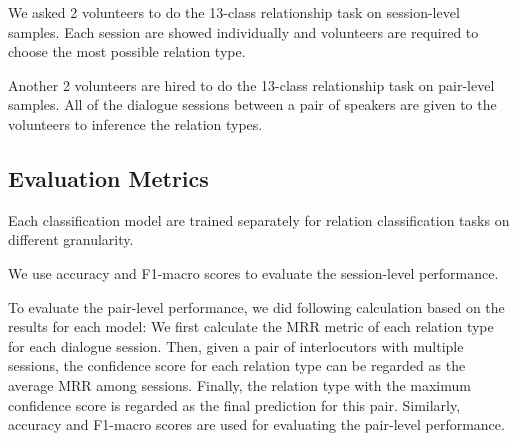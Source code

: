 We asked 2 volunteers to do the 13-class relationship task on session-level samples.  Each session are showed individually and volunteers are required to choose the most possible relation type. 

Another 2 volunteers are hired to do the 13-class relationship task on pair-level samples. All of the dialogue sessions between a pair of speakers are given to the volunteers to inference the relation types.


\subsection{Evaluation Metrics}
\label{sec:metrics}
Each classification model are trained separately for relation classification tasks on different granularity. 

We use accuracy and F1-macro scores to evaluate the session-level performance.

To evaluate the pair-level performance, we did following calculation based on the results for each model: We first calculate the MRR metric of each relation type for each dialogue session. Then, given a pair of interlocutors with multiple sessions, the confidence score for each relation type can be regarded as the average MRR among sessions. Finally, the relation type with the maximum confidence score is regarded as the final prediction for this pair. Similarly, accuracy and F1-macro scores are used for evaluating the pair-level performance.


